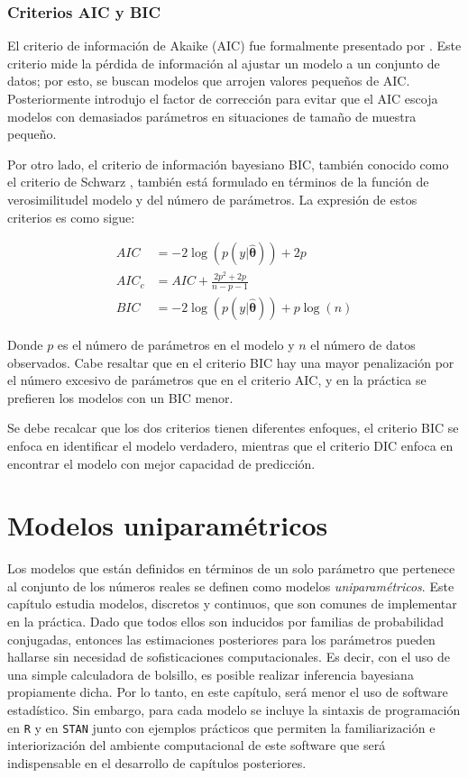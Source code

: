 \documentclass[
  10pt,
  spanish,
]{book}
\theoremstyle{definition}
\theoremstyle{definition}
\theoremstyle{definition}
\theoremstyle{definition}
\theoremstyle{remark}
\begin{document}
\hypertarget{criterios-aic-y-bic}{%
\subsection{Criterios AIC y BIC}\label{criterios-aic-y-bic}}

El criterio de información de Akaike (AIC) fue formalmente presentado por \citet{Akaike}. Este criterio mide la pérdida de información al
ajustar un modelo a un conjunto de datos; por esto, se buscan modelos
que arrojen valores pequeños de AIC. Posteriormente \citep{AICc}
introdujo el factor de corrección para evitar que el AIC escoja modelos
con demasiados parámetros en situaciones de tamaño de muestra pequeño.

Por otro lado, el criterio de información bayesiano BIC, también
conocido como el criterio de Schwarz \citep{Schwarz}, también está
formulado en términos de la función de verosimilitudel modelo y del
número de parámetros. La expresión de estos criterios es como sigue:

\begin{align*}
AIC&=-2\log(p(y|\hat{\boldsymbol \theta}))+2p\\
AIC_c&=AIC+\frac{2p^2+2p}{n-p-1}\\
BIC&=-2\log(p(y|\hat{\boldsymbol \theta}))+p\log(n)
\end{align*}

Donde \(p\) es el número de parámetros en el modelo y \(n\) el número de
datos observados. Cabe resaltar que en el criterio BIC hay una mayor
penalización por el número excesivo de parámetros que en el criterio
AIC, y en la práctica se prefieren los modelos con un BIC menor.

Se debe recalcar que los dos criterios tienen diferentes
enfoques, el criterio BIC se enfoca en identificar el modelo verdadero,
mientras que el criterio DIC enfoca en encontrar el modelo con mejor
capacidad de predicción.

\hypertarget{modelos-uniparamuxe9tricos}{%
\chapter{Modelos uniparamétricos}\label{modelos-uniparamuxe9tricos}}

Los modelos que están definidos en términos de un solo parámetro que
pertenece al conjunto de los números reales se definen como modelos
\emph{uniparamétricos}. Este capítulo estudia modelos, discretos y continuos,
que son comunes de implementar en la práctica. Dado que todos ellos son
inducidos por familias de probabilidad conjugadas, entonces las
estimaciones posteriores para los parámetros pueden hallarse sin
necesidad de sofisticaciones computacionales. Es decir, con el uso de
una simple calculadora de bolsillo, es posible realizar inferencia
bayesiana propiamente dicha. Por lo tanto, en este capítulo, será menor
el uso de software estadístico. Sin embargo, para cada modelo se incluye
la sintaxis de programación en \texttt{R} y en \texttt{STAN} junto con ejemplos
prácticos que permiten la familiarización e interiorización del ambiente
computacional de este software que será indispensable en el desarrollo
de capítulos posteriores.
\end{document}
